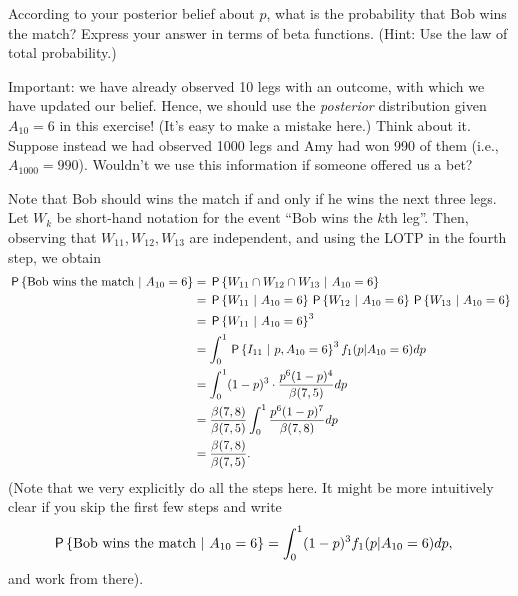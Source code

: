 \begin{exercise}
According to your posterior belief about $p$, what is the probability that Bob wins the match? Express your answer in terms of beta functions. (Hint: Use the law of total probability.)
\begin{solution}
Important: we have already observed 10 legs with an outcome, with which we have updated our belief. Hence, we should use the \textit{posterior} distribution given $A_{10} = 6$ in this exercise! (It's easy to make a mistake here.)
Think about it. Suppose instead we had observed 1000 legs and Amy had won 990 of them (i.e., $A_{1000} = 990$). Wouldn't we use this information if someone offered us a bet?

Note that Bob should wins the match if and only if he wins the next three legs. Let $W_k$ be short-hand notation for the event ``Bob wins the $k$th leg''. Then, observing that $W_{11},W_{12},W_{13}$ are independent, and using the LOTP in the fourth step, we obtain
\begin{align}
    \P{ \text{Bob wins the match} \ | \ A_{10} = 6 } &= \P{ W_{11} \cap W_{12} \cap W_{13} \ | \ A_{10} = 6 } \\
    &= \P{ W_{11} \ | \ A_{10} = 6} \P{ W_{12} \ | \ A_{10} = 6} \P{ W_{13} \ | \ A_{10} = 6} \\
    &= \P{ W_{11} \ | \ A_{10} = 6}^3 \\
    &= \int_{0}^1 \P{ I_{11} \ | \ p,  A_{10} = 6}^3 f_1(p | A_{10} = 6) dp \\
    &= \int_{0}^1 (1-p)^3 \cdot \frac{p^6(1-p)^{4}}{\beta(7,5)}  dp \\
    &= \frac{\beta(7,8)}{\beta(7,5)} \int_{0}^1 \frac{p^6(1-p)^{7}}{\beta(7,8)}  dp \\
    &= \frac{\beta(7,8)}{\beta(7,5)}.
\end{align}
(Note that we very explicitly do all the steps here. It might be more intuitively clear if you skip the first few steps and write
\begin{align}
    \P{ \text{Bob wins the match} \ | \ A_{10} = 6 } &= \int_{0}^1 (1-p)^3 f_1(p | A_{10} = 6) dp,
\end{align}
and work from there).
\end{solution}
\end{exercise}

